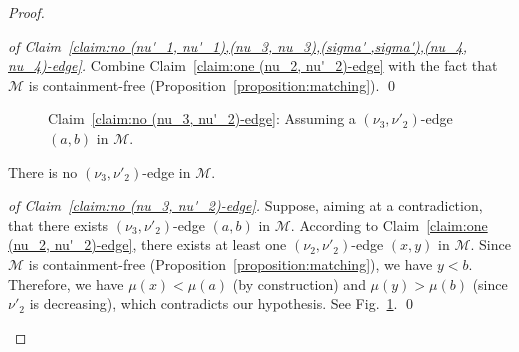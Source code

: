 \documentclass[a4paper,10pt]{llncs}
\begin{document}
\begin{proof}
  \begin{proof}[of Claim~\ref{claim:no (nu'_1, nu'_1),(nu_3, nu_3),(sigma' ,sigma'),(nu_4, nu_4)-edge}]
    Combine Claim~\ref{claim:one (nu_2, nu'_2)-edge} with the fact that
    $\mathcal{M}$ is containment-free (Proposition~\ref{proposition:matching}).
    \qed
  \end{proof}

  \begin{figure}[t!]
    \centering
    \caption{\label{fig:subfig:no (nu_3, nu'_2)-edge}%
      Claim~\ref{claim:no (nu_3, nu'_2)-edge}:
      Assuming a $(\nu_3, \nu'_2)$-edge $(a, b)$ in $\mathcal{M}$.
    }
  \end{figure}

  \begin{claim}
    \label{claim:no (nu_3, nu'_2)-edge}
    There is no $(\nu_3, \nu'_2)$-edge in $\mathcal{M}$.
  \end{claim}

  \begin{proof}[of Claim~\ref{claim:no (nu_3, nu'_2)-edge}]
    Suppose, aiming at a contradiction, that there exists
    $(\nu_3, \nu'_2)$-edge $(a, b)$ in $\mathcal{M}$.
    According to Claim~\ref{claim:one (nu_2, nu'_2)-edge}, there
    exists at least one $(\nu_2, \nu'_2)$-edge $(x, y)$ in $\mathcal{M}$.
    Since $\mathcal{M}$ is containment-free (Proposition~\ref{proposition:matching}),
    we have $y < b$.
    Therefore,
    we have $\mu(x) < \mu(a)$ (by construction) and
    $\mu(y) > \mu(b)$ (since $\nu'_2$ is decreasing),
    which contradicts our hypothesis.
    See Fig.~\ref{fig:subfig:no (nu_3, nu'_2)-edge}.
    \qed
  \end{proof}


\end{proof}
\end{document}
